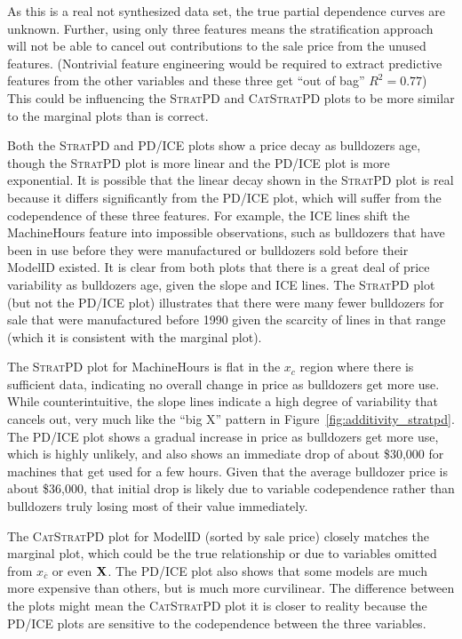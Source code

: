 \documentclass[12pt]{article}
\newcommand{\figref}[1]{Figure~\ref{#1}}
\newcommand{\spd}{\fontfamily{cmr}\textsc{\small StratPD}}
\newcommand{\cspd}{\fontfamily{cmr}\textsc{\small CatStratPD}}
\newcommand{\xnc}{$x_{\overline{c}}$}
\begin{document}
As this is a real not synthesized data set, the true partial dependence curves are unknown. Further, using only three features means the stratification approach will not be able to cancel out contributions to the sale price from the unused features. (Nontrivial feature engineering would be required to extract predictive features from the other variables and these three get ``out of bag'' $R^2=0.77$) This could be influencing the \spd{} and \cspd{} plots to be more similar to the marginal plots than is correct.

Both the \spd{} and PD/ICE plots show a price decay as bulldozers age, though the \spd{} plot is more linear and the PD/ICE plot is more exponential. It is possible that the linear decay shown in the \spd{} plot is real because it differs significantly from the PD/ICE plot, which will suffer from the codependence of these three features. For example, the ICE lines shift the MachineHours feature into impossible observations, such as bulldozers that have been in use before they were manufactured or bulldozers sold before their ModelID existed. It is clear from both plots that there is a great deal of price variability as bulldozers age, given the slope and ICE lines.  The \spd{} plot (but not the PD/ICE plot) illustrates that there were many fewer bulldozers for sale that were manufactured before 1990 given the scarcity of lines in that range (which it is consistent with the marginal plot).

The \spd{} plot for MachineHours is flat in the $x_c$ region where there is sufficient data, indicating no overall change in price as bulldozers get more use.  While counterintuitive, the slope lines indicate a high degree of variability that cancels out, very much like the ``big X'' pattern in \figref{fig:additivity_stratpd}. The PD/ICE plot shows a gradual increase in price as bulldozers get more use, which is highly unlikely, and also shows an immediate drop of about \$30,000 for machines that get used for a few hours. Given that the average bulldozer price is about \$36,000, that initial drop is likely due to variable codependence rather than bulldozers truly losing most of their value immediately.

The \cspd{} plot for ModelID (sorted by sale price) closely matches the marginal plot, which could be the true relationship or due to variables omitted from \xnc{} or even $\bf X$. The PD/ICE plot also shows that some models are much more expensive than others, but is much more curvilinear. The difference between the plots might mean the \cspd{} plot it is closer to reality because the PD/ICE plots are sensitive to the codependence between the three variables.
\end{document}
